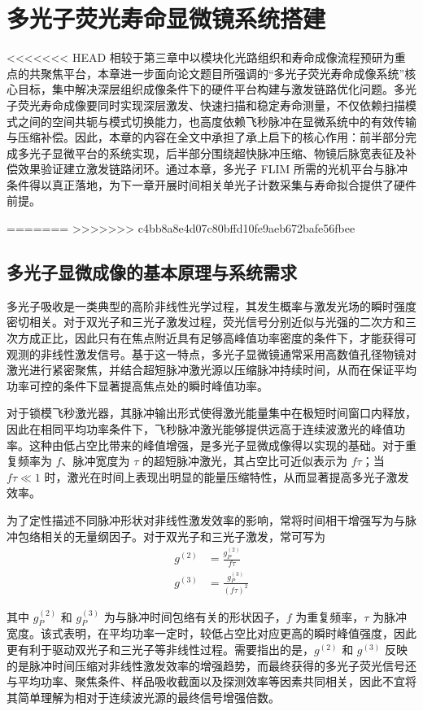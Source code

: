 \chapter{多光子荧光寿命显微镜系统搭建}\label{Chap:4}

<<<<<<< HEAD
相较于第三章中以模块化光路组织和寿命成像流程预研为重点的共聚焦平台，本章进一步面向论文题目所强调的“多光子荧光寿命成像系统”核心目标，集中解决深层组织成像条件下的硬件平台构建与激发链路优化问题。多光子荧光寿命成像要同时实现深层激发、快速扫描和稳定寿命测量，不仅依赖扫描模式之间的空间共轭与模式切换能力，也高度依赖飞秒脉冲在显微系统中的有效传输与压缩补偿。因此，本章的内容在全文中承担了承上启下的核心作用：前半部分完成多光子显微平台的系统实现，后半部分围绕超快脉冲压缩、物镜后脉宽表征及补偿效果验证建立激发链路闭环。通过本章，多光子 FLIM 所需的光机平台与脉冲条件得以真正落地，为下一章开展时间相关单光子计数采集与寿命拟合提供了硬件前提。

=======
>>>>>>> c4bb8a8e4d07c80bffd10fe9aeb672bafe56fbee
\section{多光子显微成像的基本原理与系统需求}\label{4.1}

多光子吸收是一类典型的高阶非线性光学过程，其发生概率与激发光场的瞬时强度密切相关。对于双光子和三光子激发过程，荧光信号分别近似与光强的二次方和三次方成正比，因此只有在焦点附近具有足够高峰值功率密度的条件下，才能获得可观测的非线性激发信号。基于这一特点，多光子显微镜通常采用高数值孔径物镜对激光进行紧密聚焦，并结合超短脉冲激光源以压缩脉冲持续时间，从而在保证平均功率可控的条件下显著提高焦点处的瞬时峰值功率。

对于锁模飞秒激光器，其脉冲输出形式使得激光能量集中在极短时间窗口内释放，因此在相同平均功率条件下，飞秒脉冲激光能够提供远高于连续波激光的峰值功率。这种由低占空比带来的峰值增强，是多光子显微成像得以实现的基础。对于重复频率为 $f$、脉冲宽度为 $\tau$ 的超短脉冲激光，其占空比可近似表示为 $f\tau$；当 $f\tau \ll 1$ 时，激光在时间上表现出明显的能量压缩特性，从而显著提高多光子激发效率。

为了定性描述不同脉冲形状对非线性激发效率的影响，常将时间相干增强写为与脉冲包络相关的无量纲因子。对于双光子和三光子激发，常可写为
\begin{align}
  g^{(2)} &= \frac{g_P^{(2)}}{f\tau}\\
  g^{(3)} &= \frac{g_P^{(3)}}{(f\tau)^2}
\end{align}

其中 $g_P^{(2)}$ 和 $g_P^{(3)}$ 为与脉冲时间包络有关的形状因子，$f$ 为重复频率，$\tau$ 为脉冲宽度。该式表明，在平均功率一定时，较低占空比对应更高的瞬时峰值强度，因此更有利于驱动双光子和三光子等非线性过程。需要指出的是，$g^{(2)}$ 和 $g^{(3)}$ 反映的是脉冲时间压缩对非线性激发效率的增强趋势，而最终获得的多光子荧光信号还与平均功率、聚焦条件、样品吸收截面以及探测效率等因素共同相关，因此不宜将其简单理解为相对于连续波光源的最终信号增强倍数。

